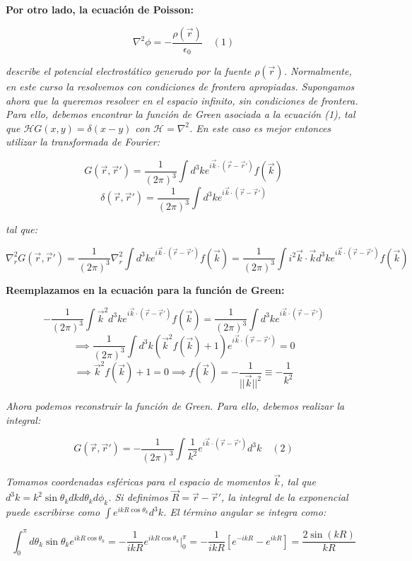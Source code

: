 \documentclass[a4paper]{article}
\begin{document}
\textbf{Por otro lado, la ecuación de Poisson:}

$$ \nabla^2\phi = -\frac{\rho(\vec{r})}{\epsilon_0} \quad (1) $$

\textit{describe el potencial electrostático generado por la fuente $\rho(\vec{r})$. Normalmente, en este curso la resolvemos con condiciones de frontera apropiadas. Supongamos ahora que la queremos resolver en el espacio infinito, sin condiciones de frontera. Para ello, debemos encontrar la función de Green asociada a la ecuación (1), tal que $\mathscr{H}G(x, y) = \delta(x - y)$ con $\mathscr{H} = \nabla^2$. En este caso es mejor entonces utilizar la transformada de Fourier:}

$$ G(\vec{r}, \vec{r}') = \frac{1}{(2\pi)^3} \int d^3k e^{i\vec{k}\cdot(\vec{r}-\vec{r}')}f(\vec{k}) $$
$$ \delta(\vec{r}, \vec{r}') = \frac{1}{(2\pi)^3} \int d^3k e^{i\vec{k}\cdot(\vec{r}-\vec{r}')} $$

\textit{tal que:}

$$ \nabla^2_{r} G(\vec{r}, \vec{r}') = \frac{1}{(2\pi)^3} \nabla^2_{r} \int d^3k e^{i\vec{k}\cdot(\vec{r}-\vec{r}')}f(\vec{k}) = \frac{1}{(2\pi)^3} \int i^2 \vec{k} \cdot \vec{k} d^3k e^{i\vec{k}\cdot(\vec{r}-\vec{r}')}f(\vec{k}) $$

\textbf{Reemplazamos en la ecuación para la función de Green:}

$$ -\frac{1}{(2\pi)^3} \int \vec{k}^2 d^3k e^{i\vec{k}\cdot(\vec{r}-\vec{r}')}f(\vec{k}) = \frac{1}{(2\pi)^3} \int d^3k e^{i\vec{k}\cdot(\vec{r}-\vec{r}')} $$
$$ \implies \frac{1}{(2\pi)^3} \int d^3k (\vec{k}^2 f(\vec{k}) + 1) e^{i\vec{k}\cdot(\vec{r}-\vec{r}')} = 0 $$
$$ \implies \vec{k}^2 f(\vec{k}) + 1 = 0 \implies f(\vec{k}) = -\frac{1}{||\vec{k}||^2} \equiv -\frac{1}{k^2} $$

\textit{Ahora podemos reconstruir la función de Green. Para ello, debemos realizar la integral:}

$$ G(\vec{r}, \vec{r}') = -\frac{1}{(2\pi)^3} \int \frac{1}{k^2} e^{i\vec{k}\cdot(\vec{r}-\vec{r}')} d^3k \quad (2) $$

\textit{Tomamos coordenadas esféricas para el espacio de momentos $\vec{k}$, tal que $d^3k = k^2 \sin \theta_k dk d\theta_k d\phi_k$. Si definimos $\vec{R} = \vec{r} - \vec{r}'$, la integral de la exponencial puede escribirse como $\int e^{ikR\cos\theta_k} d^3k$. El término angular se integra como:}

$$ \int_0^\pi d\theta_k \sin \theta_k e^{ikR\cos\theta_k} = -\frac{1}{ikR} e^{ikR\cos\theta_k} \Big|_0^\pi = -\frac{1}{ikR} [e^{-ikR} - e^{ikR}] = \frac{2 \sin(kR)}{kR} $$
\end{document}
